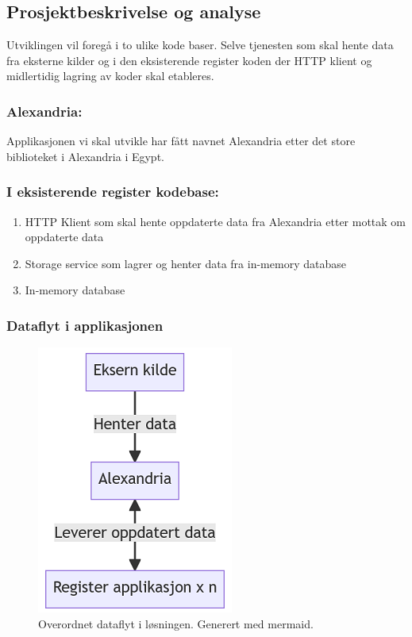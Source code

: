 \subsection{Prosjektbeskrivelse og analyse}  

Utviklingen vil foregå i to ulike kode baser. Selve tjenesten som skal hente data fra eksterne kilder og i den eksisterende register koden der HTTP klient og midlertidig lagring av koder skal etableres.

\subsubsection*{Alexandria:} 
Applikasjonen vi skal utvikle har fått navnet Alexandria etter det store biblioteket i Alexandria i Egypt.

\subsubsection*{I eksisterende register kodebase:}

\begin{enumerate} 
    \item HTTP Klient som skal hente oppdaterte data fra Alexandria etter mottak om oppdaterte data 
    \item Storage service som lagrer og henter data fra in-memory database
    \item In-memory database
\end{enumerate}

\subsubsection*{Dataflyt i applikasjonen} 

\begin{figure}[ht]
\centering
\includegraphics{images/dataflyt1.png}
\caption{Overordnet dataflyt i løsningen. Generert med mermaid.}
\label{fig:dataflyt1}
\end{figure}


